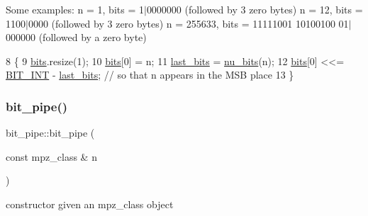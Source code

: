 Some examples\+: n = 1, bits = 1$\vert$0000000 (followed by 3 zero bytes) n = 12, bits = 1100$\vert$0000 (followed by 3 zero bytes) n = 255633, bits = 11111001 10100100 01$\vert$000000 (followed by a zero byte) 
\begin{DoxyCode}
8                                        \{
9   \hyperlink{classbit__pipe_a86f38af1e9736b053728033490476b50}{bits}.resize(1);
10   \hyperlink{classbit__pipe_a86f38af1e9736b053728033490476b50}{bits}[0] = n;
11   \hyperlink{classbit__pipe_a0f3e84b02751803adaab499b5dad86fe}{last\_bits} = \hyperlink{bitstream_8cpp_a9dfce6f51e3febb3973aa3b16c2fecb4}{nu\_bits}(n);
12   \hyperlink{classbit__pipe_a86f38af1e9736b053728033490476b50}{bits}[0] <<= \hyperlink{bitstream_8h_afcadf5aa65c5159bfb96c4d82ebc0a5d}{BIT\_INT} - \hyperlink{classbit__pipe_a0f3e84b02751803adaab499b5dad86fe}{last\_bits}; \textcolor{comment}{// so that n appears in the MSB place }
13 \}
\end{DoxyCode}
\mbox{\label{classbit__pipe_adc311ad05b01a2ec6e979882aa8b703e}} 
\subsubsection{\texorpdfstring{bit\+\_\+pipe()}{bit\_pipe()}\hspace{0.1cm}{\footnotesize\ttfamily [3/3]}}
{\footnotesize\ttfamily bit\+\_\+pipe\+::bit\+\_\+pipe (\begin{DoxyParamCaption}\item[{const mpz\+\_\+class \&}]{n }\end{DoxyParamCaption})}



constructor given an mpz\+\_\+class object 


